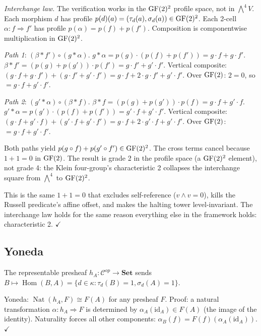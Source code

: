 \emph{Interchange law.}
The verification works in the $\operatorname{GF}(2)^2$ profile space,
not in $\bigwedge^4 V$. Each morphism $d$ has profile
$p(d)(a) = (\tau_d(a), \sigma_d(a)) \in \operatorname{GF}(2)^2$.
Each 2-cell $\alpha: f \Rightarrow f'$ has profile
$p(\alpha) = p(f) + p(f')$. Composition is componentwise
multiplication in $\operatorname{GF}(2)^2$.

\emph{Path 1}: $(\beta * f') \circ (g * \alpha)$.
$g * \alpha = p(g) \cdot (p(f) + p(f')) = g \cdot f +
g \cdot f'$. $\beta * f' = (p(g) + p(g')) \cdot p(f') =
g \cdot f' + g' \cdot f'$. Vertical composite:
$(g \cdot f + g \cdot f') + (g \cdot f' + g' \cdot f')
= g \cdot f + 2 \cdot g \cdot f' + g' \cdot f'$. Over
$\operatorname{GF}(2)$: $2 = 0$, so $= g \cdot f + g' \cdot f'$.

\emph{Path 2}: $(g' * \alpha) \circ (\beta * f)$.
$\beta * f = (p(g) + p(g')) \cdot p(f) =
g \cdot f + g' \cdot f$. $g' * \alpha =
p(g') \cdot (p(f) + p(f')) = g' \cdot f + g' \cdot f'$.
Vertical composite:
$(g \cdot f + g' \cdot f) + (g' \cdot f + g' \cdot f')
= g \cdot f + 2 \cdot g' \cdot f + g' \cdot f'$. Over
$\operatorname{GF}(2)$: $= g \cdot f + g' \cdot f'$.

Both paths yield $p(g \circ f) + p(g' \circ f')
\in \operatorname{GF}(2)^2$. The cross terms cancel because
$1 + 1 = 0$ in $\operatorname{GF}(2)$. The result is grade 2 in
the profile space (a $\operatorname{GF}(2)^2$ element), not grade 4:
the Klein four-group's characteristic 2 collapses the
interchange square from $\bigwedge^4$ to $\operatorname{GF}(2)^2$.

This is the same $1 + 1 = 0$ that excludes
self-reference ($v \wedge v = 0$), kills the Russell
predicate's affine offset, and makes the halting
tower level-invariant. The interchange law holds for
the same reason everything else in the framework
holds: characteristic 2. $\checkmark$

\subsection{Yoneda}
\label{app:yoneda-full}

The representable presheaf $h_A: \mathcal{C}^{op} \to
\mathbf{Set}$ sends $B \mapsto \operatorname{Hom}(B, A) =
\{d \in \kappa : \tau_d(B) = 1, \sigma_d(A) = 1\}$.

Yoneda: $\operatorname{Nat}(h_A, F) \cong F(A)$ for any
presheaf $F$. Proof: a natural transformation
$\alpha: h_A \Rightarrow F$ is determined by
$\alpha_A(\mathrm{id}_A) \in F(A)$ (the image of the
identity). Naturality forces all other components:
$\alpha_B(f) = F(f)(\alpha_A(\mathrm{id}_A))$. $\checkmark$

